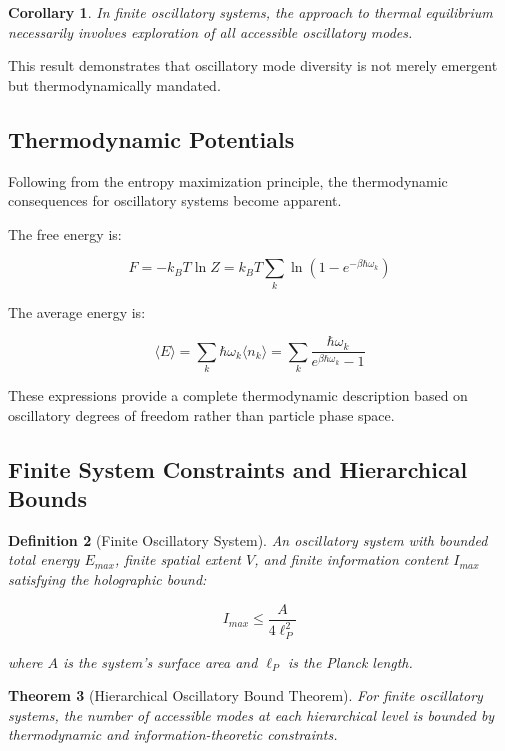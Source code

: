 \documentclass[11pt]{article}
\newtheorem{theorem}{Theorem}[section]
\newtheorem{corollary}[theorem]{Corollary}
\newtheorem{definition}[theorem]{Definition}
\theoremstyle{remark}
\begin{document}
\begin{corollary}
In finite oscillatory systems, the approach to thermal equilibrium necessarily involves exploration of all accessible oscillatory modes.
\end{corollary}

This result demonstrates that oscillatory mode diversity is not merely emergent but thermodynamically mandated.

\subsection{Thermodynamic Potentials}

Following from the entropy maximization principle, the thermodynamic consequences for oscillatory systems become apparent.

The free energy is:

$$F = -k_B T \ln Z = k_B T \sum_k \ln(1 - e^{-\beta\hbar\omega_k})$$

The average energy is:

$$\langle E\rangle = \sum_k \hbar\omega_k \langle n_k\rangle = \sum_k \frac{\hbar\omega_k}{e^{\beta\hbar\omega_k} - 1}$$

These expressions provide a complete thermodynamic description based on oscillatory degrees of freedom rather than particle phase space.

\subsection{Finite System Constraints and Hierarchical Bounds}

\begin{definition}[Finite Oscillatory System]
An oscillatory system with bounded total energy $E_{max}$, finite spatial extent $V$, and finite information content $I_{max}$ satisfying the holographic bound:

$$I_{max} \leq \frac{A}{4\ell_P^2}$$

where $A$ is the system's surface area and $\ell_P$ is the Planck length.
\end{definition}

\begin{theorem}[Hierarchical Oscillatory Bound Theorem]
For finite oscillatory systems, the number of accessible modes at each hierarchical level is bounded by thermodynamic and information-theoretic constraints.
\end{theorem}
\end{document}
